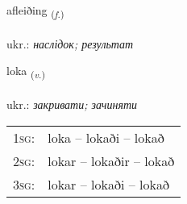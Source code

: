 \documentclass[frontgrid, backgrid]{flacards}\usepackage[]{graphicx}\usepackage[]{xcolor}
\begin{document}
\renewcommand{\flhead}{\vskip5pt \fboxsep=0pt {\small\bfseries\footnotesize Nafnorð | іменник}}
\renewcommand{\fcfoot}{\vskip5pt \fboxsep=0pt \hspace{2pt}{\small\bfseries\footnotesize 1K}}

\renewcommand{\blhead}{\vskip5pt {\small\bfseries\footnotesize Nafnorð | іменник }}
\renewcommand{\bcfoot}{\vskip5pt \hspace{2pt}{\small\bfseries\footnotesize 1K}}


{afleiðing \small{\textsubscript{(\textit{f.})}} \\[1ex] %
\textphonetic{[avleiðiŋk]} \\
ukr.: \emph{наслідок; результат} \\  [2ex]
\renewcommand*{\arraystretch}{0.8}
}

\renewcommand{\flhead}{\vskip5pt \fboxsep=0pt {\small\bfseries\footnotesize Sagnorð | дієслово}}
\renewcommand{\fcfoot}{\vskip5pt \fboxsep=0pt \hspace{2pt}{\small\bfseries\footnotesize 1K}}

\renewcommand{\blhead}{\vskip5pt {\small\bfseries\footnotesize Sagnorð | дієслово }}
\renewcommand{\bcfoot}{\vskip5pt \hspace{2pt}{\small\bfseries\footnotesize 1K}}


{loka \small{\textsubscript{(\textit{v.})}} \\[1ex] %
\textphonetic{[lɔːka]} \\
ukr.: \emph{закривати; зачиняти} \\  [2ex]
\renewcommand*{\arraystretch}{0.8}
\begin{tabular}{p{1cm}l}
\textsc{1sg}: & loka -- lokaði -- lokað \\ 
\textsc{2sg}: & lokar -- lokaðir -- lokað \\ 
\textsc{3sg}: & lokar -- lokaði -- lokað \\ 
\end{tabular}
}
\end{document}
